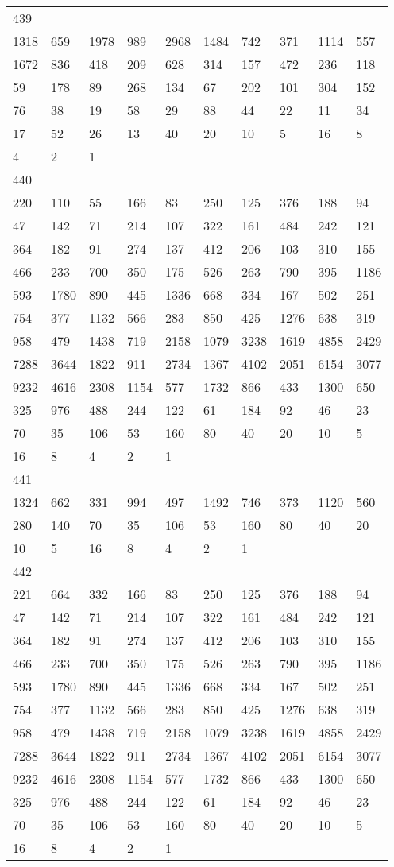 \begin{longtable}{*{10}{l}}
439&&&&&&&&&\\
1318& 659& 1978& 989& 2968& 1484& 742& 371& 1114& 557\\
1672& 836& 418& 209& 628& 314& 157& 472& 236& 118\\
59& 178& 89& 268& 134& 67& 202& 101& 304& 152\\
76& 38& 19& 58& 29& 88& 44& 22& 11& 34\\
17& 52& 26& 13& 40& 20& 10& 5& 16& 8\\
4& 2& 1& \\

440&&&&&&&&&\\
220& 110& 55& 166& 83& 250& 125& 376& 188& 94\\
47& 142& 71& 214& 107& 322& 161& 484& 242& 121\\
364& 182& 91& 274& 137& 412& 206& 103& 310& 155\\
466& 233& 700& 350& 175& 526& 263& 790& 395& 1186\\
593& 1780& 890& 445& 1336& 668& 334& 167& 502& 251\\
754& 377& 1132& 566& 283& 850& 425& 1276& 638& 319\\
958& 479& 1438& 719& 2158& 1079& 3238& 1619& 4858& 2429\\
7288& 3644& 1822& 911& 2734& 1367& 4102& 2051& 6154& 3077\\
9232& 4616& 2308& 1154& 577& 1732& 866& 433& 1300& 650\\
325& 976& 488& 244& 122& 61& 184& 92& 46& 23\\
70& 35& 106& 53& 160& 80& 40& 20& 10& 5\\
16& 8& 4& 2& 1& \\

441&&&&&&&&&\\
1324& 662& 331& 994& 497& 1492& 746& 373& 1120& 560\\
280& 140& 70& 35& 106& 53& 160& 80& 40& 20\\
10& 5& 16& 8& 4& 2& 1& \\

442&&&&&&&&&\\
221& 664& 332& 166& 83& 250& 125& 376& 188& 94\\
47& 142& 71& 214& 107& 322& 161& 484& 242& 121\\
364& 182& 91& 274& 137& 412& 206& 103& 310& 155\\
466& 233& 700& 350& 175& 526& 263& 790& 395& 1186\\
593& 1780& 890& 445& 1336& 668& 334& 167& 502& 251\\
754& 377& 1132& 566& 283& 850& 425& 1276& 638& 319\\
958& 479& 1438& 719& 2158& 1079& 3238& 1619& 4858& 2429\\
7288& 3644& 1822& 911& 2734& 1367& 4102& 2051& 6154& 3077\\
9232& 4616& 2308& 1154& 577& 1732& 866& 433& 1300& 650\\
325& 976& 488& 244& 122& 61& 184& 92& 46& 23\\
70& 35& 106& 53& 160& 80& 40& 20& 10& 5\\
16& 8& 4& 2& 1& \\


\end{longtable}
